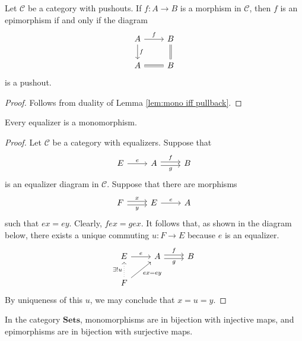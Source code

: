 \begin{corollary}
Let $\mathcal{C}$ be a category with pushouts. If $f : A \to B$ is a morphism in $\mathcal{C}$, then $f$ is an epimorphism if and only if the diagram
\[
	\begin{tikzcd}
		A \arrow[r, "f"] \arrow[d, "f"] & B \arrow[d, equal] \\
		A \arrow[r, equal]              & B
	\end{tikzcd}
\]
is a pushout.
\end{corollary}
\begin{proof}
Follows from duality of Lemma \ref{lem:mono iff pullback}.
\end{proof}
\begin{lemma}
Every equalizer is a monomorphism.
\end{lemma}
\begin{proof}
Let $\mathcal{C}$ be a category with equalizers. Suppose that
\[ \begin{tikzcd} E \arrow[r, "e"] & A \arrow[r, shift left=0.50ex, "f"] \arrow[r, swap, shift right=0.50ex, "g"] & B \end{tikzcd} \]
is an equalizer diagram in $\mathcal{C}$. Suppose that there are morphisms
\[ \begin{tikzcd} F
\arrow[r, shift left=0.50ex, "x"] 
\arrow[r, swap, shift right=0.50ex, "y"] & E \arrow[r, "e"] & A \end{tikzcd} \]
such that $ex = ey$. Clearly, $fex = gex$. It follows that, as shown in the diagram below, there exists a unique commuting $u : F \to E$ because $e$ is an equalizer.
\[ \begin{tikzcd} E \arrow[r, "e"] & A 
\arrow[r, shift left=0.50ex, "f"] 
\arrow[r, swap, shift right=0.50ex, "g"] & B \\
F
\arrow[ur, swap, "ex = ey"]
\arrow[u, dotted, "\exists ! u"] \end{tikzcd} \]
By uniqueness of this $u$, we may conclude that $x=u=y$.
\end{proof}
\begin{proposition}
In the category $\mathbf{Sets}$, monomorphisms are in bijection with injective maps, and epimorphisms are in bijection with surjective maps.
\end{proposition}
